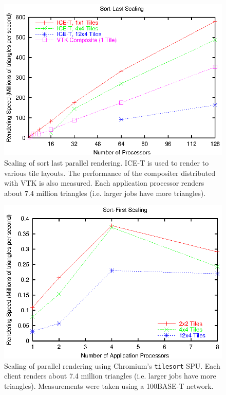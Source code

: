 \documentclass{acmsiggraph}
\newcommand{\cidentifier}[1]{\texttt{#1}}
\begin{document}
  \begin{figure}
    \includegraphics[width=\linewidth]{images/scaling_icet_weak}
    \caption{Scaling of sort last parallel rendering.  ICE-T is used to
      render to various tile layouts.  The performance of the compositer
      distributed with VTK is also measured.  Each application processor
      renders about 7.4 million triangles (i.e. larger jobs have more
      triangles).}
    \label{fig:ice-t}
  \end{figure}

  \begin{figure}
    \includegraphics[width=\linewidth]{images/scaling_chromium}
    \caption{Scaling of parallel rendering using Chromium's
      \cidentifier{tile\-sort} SPU.  Each client renders about 7.4 million
      triangles (i.e. larger jobs have more triangles).  Measurements were
      taken using a 100BASE-T network.}
    \label{fig:chromium}
  \end{figure}
\end{document}
